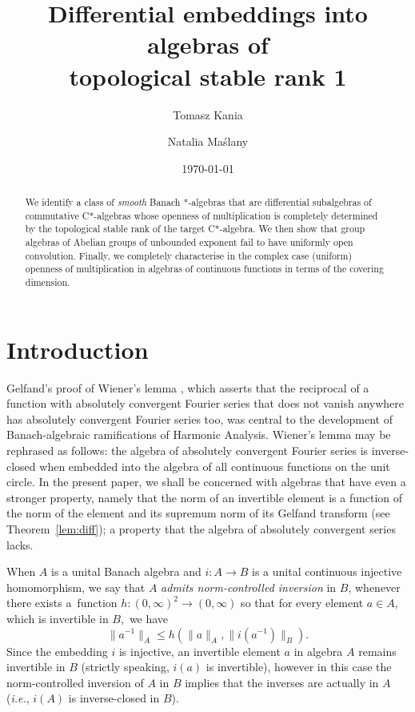 \documentclass[12pt,fleqn]{amsart}
\title[Differential embeddings into algebras of topological stable rank 1]{Differential embeddings into algebras of\\ topological stable rank 1}
\author[T.~Kania]{Tomasz Kania}
\author[N.~Ma\'slany]{Natalia Ma\'slany}
\date{\today}
\theoremstyle{definition}
\numberwithin{equation}{section}
\theoremstyle{remark}
\begin{document}
\begin{abstract}
    We identify a class of \emph{smooth} Banach *-algebras that are differential subalgebras of commutative C*-algebras whose openness of multiplication is completely determined by the topological stable rank of the target C*-algebra. 
    We then show that group algebras of Abelian groups of unbounded exponent fail to have uniformly open convolution. Finally, we completely characterise in the complex case (uniform) openness of multiplication in algebras of continuous functions in terms of the covering dimension.
\end{abstract}
\maketitle
\section{Introduction}Gelfand's proof of Wiener's lemma \cite{gelfand1941normierte}, which asserts that the reciprocal of a function with absolutely convergent Fourier series that does not vanish anywhere has absolutely convergent Fourier series too, was central to the development of Banach-algebraic ramifications of Harmonic Analysis. Wiener's lemma may be rephrased as follows: the algebra of absolutely convergent Fourier series is inverse-closed when embedded into the algebra of all continuous functions on the unit circle. In the present paper, we shall be concerned with algebras that have even a stronger property, namely that the norm of an invertible element is a function of the norm of the element and its supremum norm of its Gelfand transform (see Theorem~\ref{lem:diff}); a property that the algebra of absolutely convergent series lacks.\smallskip

When $A$ is a unital Banach algebra and $i\colon A\to B$ is a unital continuous injective homomorphism, we say that $A$ \emph{admits norm-controlled inversion} in $B$, whenever there exists a~function $h\colon (0, \infty)^2 \to (0, \infty)$ so that for every element $a\in A$, which is invertible in $B,$ we have 
\[
    \|a^{-1}\|_A \leqslant h(\|a\|_A, \|i(a^{-1})\|_B).
\] 
Since the embedding $i$ is injective, an invertible element $a$ in algebra $A$ remains invertible in $B$ (strictly speaking, $i(a)$ is invertible), however in this case  the norm-controlled inversion of $A$ in $B$ implies that the inverses are actually in $A$ (\emph{i.e.}, $i(A)$ is inverse-closed in $B$).\medskip
\end{document}
